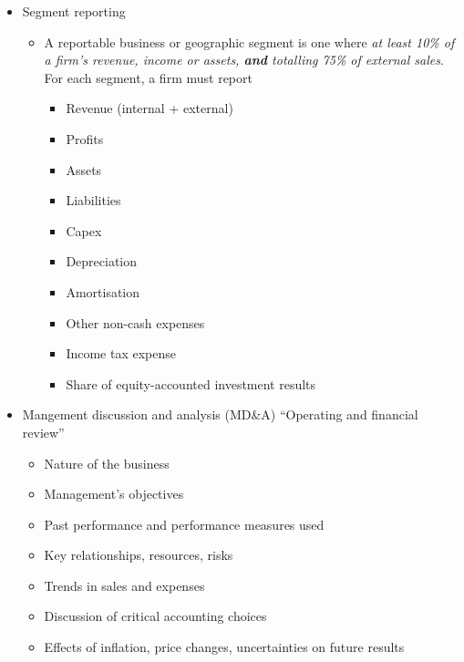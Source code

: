 \documentclass[../notes_compiled.tex]{subfiles}
\begin{document}
\begin{itemize}
\item Segment reporting
\begin{itemize}
\item A reportable business or geographic segment is one where \emph{at least 10\% of a firm's revenue, income or assets, \textbf{and} totalling 75\% of external sales}. For each segment, a firm must report
\begin{multicols}{2}
\begin{itemize}
\item Revenue (internal + external)
\item Profits
\item Assets
\item Liabilities
\item Capex
\item Depreciation
\item Amortisation
\item Other non-cash expenses
\item Income tax expense
\item Share of equity-accounted investment results
\end{itemize}
\end{multicols}
\end{itemize}
\item Mangement discussion and analysis (MD\&A) ``Operating and financial review''
\begin{itemize}
\item Nature of the business
\item Management's objectives
\item Past performance and performance measures used
\item Key relationships, resources, risks
\item Trends in sales and expenses
\item Discussion of critical accounting choices
\item Effects of inflation, price changes, uncertainties on future results
\end{itemize}
\end{itemize}
\end{document}
